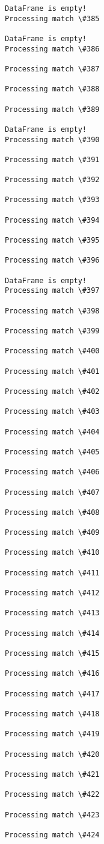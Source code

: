 \documentclass[11pt]{article}
\begin{document}
\begin{Verbatim}[commandchars=\\\{\}]
DataFrame is empty!
Processing match \#385

DataFrame is empty!
Processing match \#386

Processing match \#387

Processing match \#388

Processing match \#389

DataFrame is empty!
Processing match \#390

Processing match \#391

Processing match \#392

Processing match \#393

Processing match \#394

Processing match \#395

Processing match \#396

DataFrame is empty!
Processing match \#397

Processing match \#398

Processing match \#399

Processing match \#400

Processing match \#401

Processing match \#402

Processing match \#403

Processing match \#404

Processing match \#405

Processing match \#406

Processing match \#407

Processing match \#408

Processing match \#409

Processing match \#410

Processing match \#411

Processing match \#412

Processing match \#413

Processing match \#414

Processing match \#415

Processing match \#416

Processing match \#417

Processing match \#418

Processing match \#419

Processing match \#420

Processing match \#421

Processing match \#422

Processing match \#423

Processing match \#424


\end{Verbatim}
\end{document}
